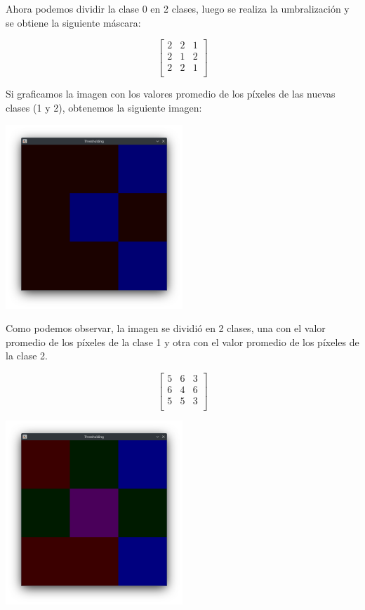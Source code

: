 Ahora podemos dividir la clase 0 en 2 clases, luego se realiza la umbralización y se obtiene la siguiente máscara:

\begin{equation*}
    \begin{bmatrix}
        2 & 2 & 1 \\
        2 & 1 & 2 \\
        2 & 2 & 1 \\
    \end{bmatrix}
\end{equation*}

Si graficamos la imagen con los valores promedio de los píxeles de las nuevas clases (1 y 2), obtenemos la siguiente imagen:

\includegraphics[width=0.5\textwidth]{./latex/img/m1}

Como podemos observar, la imagen se dividió en 2 clases, una con el valor promedio de los píxeles de la clase 1 y otra con el valor promedio de los píxeles de la clase 2.

\begin{equation*}
    \begin{bmatrix}
        5 & 6 & 3 \\
        6 & 4 & 6 \\
        5 & 5 & 3 \\
    \end{bmatrix}
\end{equation*}


\includegraphics[width=0.5\textwidth]{./latex/img/m2}


